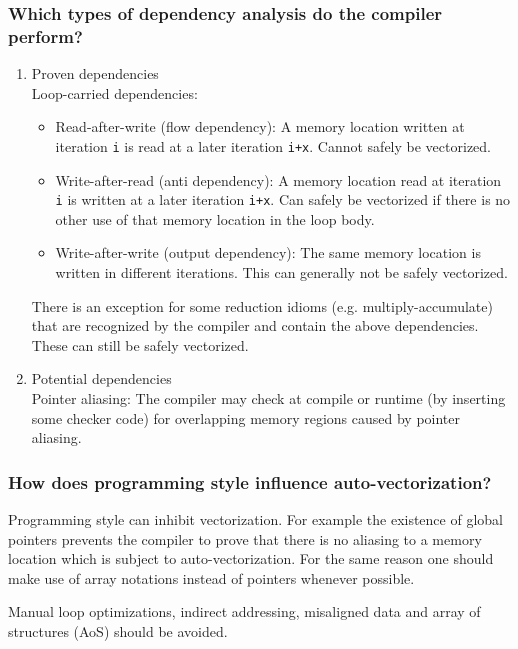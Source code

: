 \documentclass[11pt]{article}
\begin{document}
\subsubsection*{Which types of dependency analysis do the compiler perform?}
\begin{enumerate}
\item Proven dependencies\\Loop-carried dependencies:
\begin{itemize}
\item Read-after-write (flow dependency): A memory location written at iteration \texttt{i} is read at a later iteration \texttt{i+x}. Cannot safely be vectorized.
\item Write-after-read (anti dependency): A memory location read at iteration \texttt{i} is written at a later iteration \texttt{i+x}. Can safely be vectorized if there is no other use of that memory location in the loop body.
\item Write-after-write (output dependency): The same memory location is written in different iterations. This can generally not be safely vectorized.
\end{itemize}
There is an exception for some reduction idioms (e.g. multiply-accumulate) that are recognized by the compiler and contain the above dependencies. These can still be safely vectorized.
\item Potential dependencies\\Pointer aliasing:
The compiler may check at compile or runtime (by inserting some checker code) for overlapping memory regions caused by pointer aliasing.
\end{enumerate}

\subsubsection*{How does programming style influence auto-vectorization?}
Programming style can inhibit vectorization. For example the existence of global pointers prevents the compiler to prove that there is no aliasing to a memory location which is subject to auto-vectorization. For the same reason one should make use of array notations instead of pointers whenever possible.

Manual loop optimizations, indirect addressing, misaligned data and array of structures (AoS) should be avoided.
\end{document}

